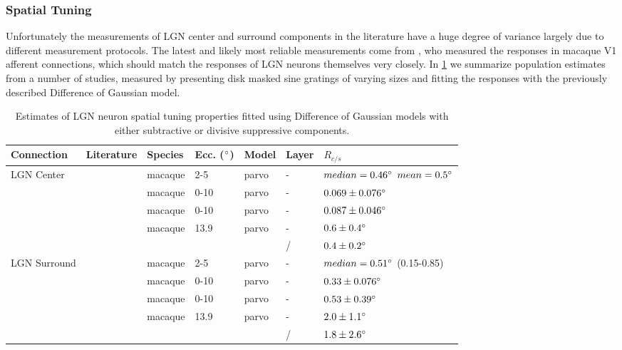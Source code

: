 \subsubsection{Spatial Tuning}

Unfortunately the measurements of LGN center and surround components
in the literature have a huge degree of variance largely due to
different measurement protocols. The latest and likely most reliable
measurements come from \citep{Sceniak2006}, who measured the responses
in macaque V1 afferent connections, which should match the responses
of LGN neurons themselves very closely.  In \ref{LGNEstimates} we
summarize population estimates from a number of studies, measured by
presenting disk masked sine gratings of varying sizes and fitting the
responses with the previously described Difference of Gaussian model.

\begin{table}
  \centering
  \begin{adjustbox}{width=1\textwidth}
  \begin{tabular}{l | l l l l l l}
    Connection   & Literature            & Species  & Ecc. ($\degree$) & Model & Layer & $R_{c/s}$ \\
    \hline
    LGN Center   & \cite{Sceniak2006}    & macaque  & 2-5  & parvo & - & $median = 0.46 \degree$ $mean = 0.5 \degree$ \\
                 & \cite{Levitt2001}     & macaque  & 0-10 & parvo & - & $0.069 \pm 0.076 \degree$ \\
                 & \cite{Spear1994}      & macaque  & 0-10 & parvo & - & $0.087 \pm 0.046 \degree$ \\
                 & \cite{Bonin2005}      & macaque  & 13.9 & parvo & - & $0.6 \pm 0.4 \degree$\\
                 &                       &          &      &       & / & $0.4 \pm 0.2 \degree$ \\
    \hline
    LGN Surround & \cite{Sceniak2006}    & macaque  & 2-5  & parvo & - &$median = 0.51 \degree$ (0.15-0.85) \\
                 & \cite{Levitt2001}     & macaque  & 0-10 & parvo & - & $0.33 \pm 0.076 \degree$ \\
                 & \cite{Spear1994}      & macaque  & 0-10 & parvo & - & $0.53 \pm 0.39 \degree$ \\
                 & \cite{Bonin2005}      & macaque  & 13.9 & parvo & - & $2.0 \pm 1.1 \degree$\\
                 &                       &          &      &       & / & $1.8 \pm 2.6 \degree$\\

    \hline
  \end{tabular}
  \end{adjustbox}
  \caption{Estimates of LGN neuron spatial tuning properties fitted using Difference of Gaussian models
           with either subtractive or divisive suppressive components.}
  \label{LGNEstimates}
\end{table}

